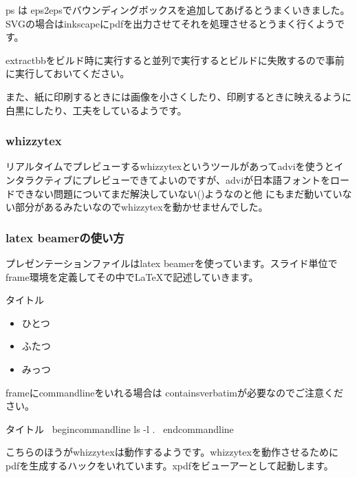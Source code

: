 \documentclass[mingoth,a4paper]{jsarticle}
\begin{document}
ps は eps2epsでバウンディングボックスを追加してあげるとうまくいきました。
SVGの場合はinkscapeにpdfを出力させてそれを処理させるとうまく行くようです。

extractbbをビルド時に実行すると並列で実行するとビルドに失敗するので事前
に実行しておいてください。

また、紙に印刷するときには画像を小さくしたり、印刷するときに映えるように
白黒にしたり、工夫をしているようです。

\subsubsection{whizzytex}

リアルタイムでプレビューするwhizzytexというツールがあってadviを使うとイ
ンタラクティブにプレビューできてよいのですが、adviが日本語フォントをロー
ドできない問題についてまだ解決していない()ようなのと他
にもまだ動いていない部分があるみたいなのでwhizzytexを動かせませんでした。

\subsubsection{latex beamerの使い方}

プレゼンテーションファイルはlatex beamerを使っています。スライド単位で
frame環境を定義してその中でLaTeXで記述していきます。

\begin{commandline}
\begin{frame}{タイトル}
  \begin{itemize}
    \item ひとつ
    \item ふたつ
    \item みっつ
  \end{itemize}
\end{frame}
\end{commandline}

frameにcommandlineをいれる場合は containsverbatimが必要なのでご注意くだ
さい。

\begin{commandline}
 \begin{frame}[containsverbatim]{タイトル}
   \ begin{commandline}
ls -l .
   \ end{commandline}
 \end{frame}
\end{commandline}

こちらのほうがwhizzytexは動作するようです。whizzytexを動作させるために
pdfを生成するハックをいれています。xpdfをビューアーとして起動します。
\end{document}
